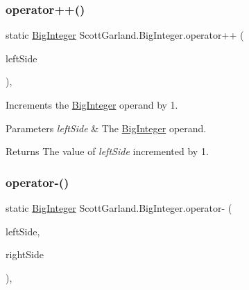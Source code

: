 \subsubsection{\texorpdfstring{operator++()}{operator++()}}
{\footnotesize\ttfamily static \hyperlink{class_scott_garland_1_1_big_integer}{Big\+Integer} Scott\+Garland.\+Big\+Integer.\+operator++ (\begin{DoxyParamCaption}\item[{\hyperlink{class_scott_garland_1_1_big_integer}{Big\+Integer}}]{left\+Side }\end{DoxyParamCaption})\hspace{0.3cm}{\ttfamily [inline]}, {\ttfamily [static]}}



Increments the \hyperlink{class_scott_garland_1_1_big_integer}{Big\+Integer} operand by 1. 


\begin{DoxyParams}{Parameters}
{\em left\+Side} & The \hyperlink{class_scott_garland_1_1_big_integer}{Big\+Integer} operand.\\
\hline
\end{DoxyParams}
\begin{DoxyReturn}{Returns}
The value of {\itshape left\+Side}  incremented by 1.
\end{DoxyReturn}
\mbox{\label{class_scott_garland_1_1_big_integer_a7ce71794183add63e9e97151290b65b3}} 
\subsubsection{\texorpdfstring{operator-\/()}{operator-()}\hspace{0.1cm}{\footnotesize\ttfamily [1/2]}}
{\footnotesize\ttfamily static \hyperlink{class_scott_garland_1_1_big_integer}{Big\+Integer} Scott\+Garland.\+Big\+Integer.\+operator-\/ (\begin{DoxyParamCaption}\item[{\hyperlink{class_scott_garland_1_1_big_integer}{Big\+Integer}}]{left\+Side,  }\item[{\hyperlink{class_scott_garland_1_1_big_integer}{Big\+Integer}}]{right\+Side }\end{DoxyParamCaption})\hspace{0.3cm}{\ttfamily [inline]}, {\ttfamily [static]}}



